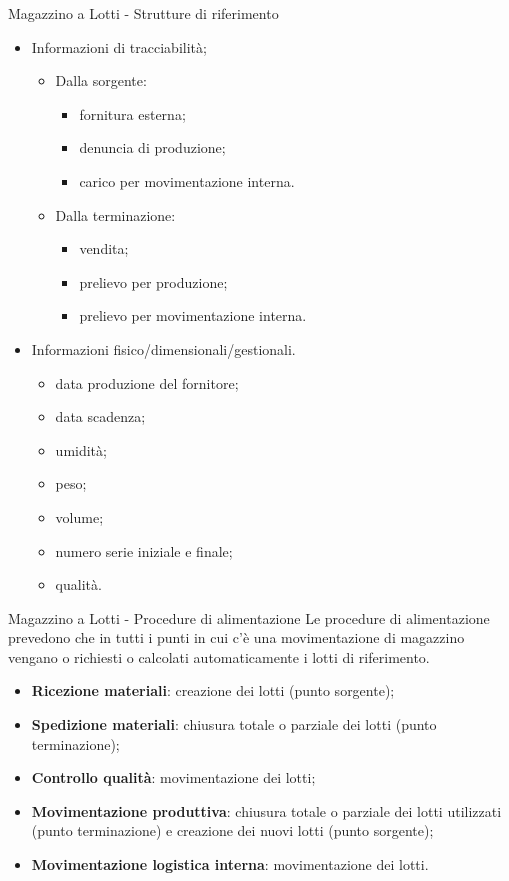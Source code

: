 \documentclass{beamer}
\begin{document}
\begin{frame}{Magazzino a Lotti - Strutture di riferimento}
    \begin{itemize}
    \item Informazioni di tracciabilità;
        \begin{itemize}
            \item Dalla sorgente:
            \begin{itemize}
                \item fornitura esterna;
                \item denuncia di produzione;
                \item carico per movimentazione interna.
            \end{itemize}
            \item Dalla terminazione:
            \begin{itemize}
                \item vendita;
                \item prelievo per produzione;
                \item prelievo per movimentazione interna.
            \end{itemize}
        \end{itemize}
        \item Informazioni fisico/dimensionali/gestionali.
        \begin{itemize}
            \item data produzione del fornitore;
            \item data scadenza;
            \item umidità;
            \item peso;
            \item volume;
            \item numero serie iniziale e finale;
            \item qualità.
        \end{itemize}
    \end{itemize}
\end{frame}

\begin{frame}{Magazzino a Lotti - Procedure di alimentazione}
    Le procedure di alimentazione prevedono che in tutti i punti in cui c’è una movimentazione di magazzino vengano o richiesti o calcolati automaticamente i lotti di riferimento.
    \begin{itemize}
        \item \textbf{Ricezione materiali}: creazione dei lotti (punto sorgente);
        \item \textbf{Spedizione materiali}: chiusura totale o parziale dei lotti (punto terminazione);
        \item \textbf{Controllo qualità}: movimentazione dei lotti;
        \item \textbf{Movimentazione produttiva}: chiusura totale o parziale dei lotti utilizzati (punto terminazione) e creazione dei nuovi lotti (punto sorgente);
        \item \textbf{Movimentazione logistica interna}: movimentazione dei lotti.
    \end{itemize}
\end{frame}
\end{document}
